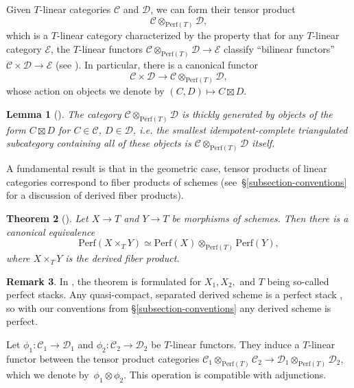 \documentclass[11pt, reqno]{amsart}
\numberwithin{equation}{section}
\theoremstyle{plain}
\newtheorem{theorem}{Theorem}[section]
\newtheorem{lemma}[theorem]{Lemma}
\theoremstyle{definition}
\newtheorem{remark}[theorem]{Remark}
\newcommand{\Perf}{\mathrm{Perf}}
\newcommand{\cC}{\mathcal{C}}
\newcommand{\cD}{\mathcal{D}}
\newcommand{\cE}{\mathcal{E}}
\begin{document}
Given $T$-linear categories $\cC$ and $\cD$, we can form their tensor product 
\begin{equation*}
\cC \otimes_{\Perf(T)} \cD, 
\end{equation*} 
which is a $T$-linear category characterized by the property that for any $T$-linear category 
$\cE$, the $T$-linear functors $\cC \otimes_{\Perf(T)} \cD \to \cE$ classify ``bilinear functors'' $\cC \times \cD \to \cE$ 
(see \cite[\S4.8]{lurie-HA}). 
In particular, there is a canonical functor 
\begin{equation*}
\cC \times \cD \to \cC \otimes_{\Perf(T)} \cD,
\end{equation*}
whose action on objects we denote by $(C,D) \mapsto C \boxtimes D$. 

\begin{lemma}[{\cite[Lemma 2.7]{NCHPD}}]
\label{lemma-generators-box-tensor}
The category $\cC \otimes_{\Perf(T)} \cD$ is thickly generated by objects of the form $C \boxtimes D$ for 
$C \in \cC$, $D \in \cD$, i.e. the smallest idempotent-complete triangulated subcategory containing all of these 
objects is $\cC \otimes_{\Perf(T)} \cD$ itself. 
\end{lemma}

A fundamental result is that in the geometric case, tensor products of linear categories correspond to 
fiber products of schemes (see~\S\ref{subsection-conventions} for a discussion of derived fiber products). 

\begin{theorem}[{\cite[Theorem 1.2]{bzfn}}]
\label{theorem-bzfn} 
Let $X \to T$ and $Y \to T$ be morphisms of schemes. 
Then there is a canonical equivalence 
\begin{equation*}
\Perf {\left( X \times_T Y \right) } \simeq \Perf(X) \otimes_{\Perf(T)} \Perf(Y), 
\end{equation*} 
where $X \times_T Y$ is the derived fiber product. 
\end{theorem} 

\begin{remark}
In \cite{bzfn}, the theorem is formulated for $X_1, X_2,$ and $T$ being so-called perfect stacks. 
Any quasi-compact, separated derived scheme is a perfect 
stack \cite[Proposition 3.19]{bzfn}, so with our conventions from \S\ref{subsection-conventions} 
any derived scheme is perfect. 
\end{remark} 

Let $\phi_1 \colon \cC_1 \to \cD_1$ and $\phi_2 \colon \cC_2 \to \cD_2$ be $T$-linear functors. 
They induce a $T$-linear functor between the tensor product categories $\cC_1 \otimes_{\Perf(T)} \cC_2 \to \cD_1 \otimes_{\Perf(T)} \cD_2$,
which we denote by~$\phi_1 \otimes \phi_2$.
This operation is compatible with adjunctions.
\end{document}
